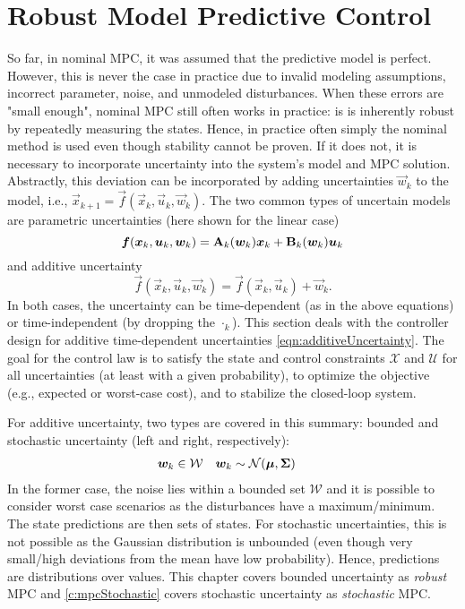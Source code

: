 \chapter{Robust Model Predictive Control}
	\label{c:mpcRobust}

	So far, in nominal MPC, it was assumed that the predictive model is perfect. However, this is never the case in practice due to invalid modeling assumptions, incorrect parameter, noise, and unmodeled disturbances. When these errors are "small enough", nominal MPC still often works in practice: is is inherently robust by repeatedly measuring the states. Hence, in practice often simply the nominal method is used even though stability cannot be proven. If it does not, it is necessary to incorporate uncertainty into the system's model and MPC solution. Abstractly, this deviation can be incorporated by adding uncertainties \(\vec{w}_k\) to the model, i.e., \( \vec{x}_{k + 1} = \vec{f}(\vec{x}_k, \vec{u}_k, \vec{w}_k) \). The two common types of uncertain models are parametric uncertainties (here shown for the linear case)
	\begin{equation}
		\bm{f}(\bm{x}_k, \bm{u}_k, \bm{w}_k) = \bm{\mathrm{A}}_k(\bm{w}_k) \bm{x}_k + \bm{\mathrm{B}}_k(\bm{w}_k) \bm{u}_k
	\end{equation}
	and additive uncertainty
	\begin{equation}
		\vec{f}(\vec{x}_k, \vec{u}_k, \vec{w}_k) = \vec{f}(\vec{x}_k, \vec{u}_k) + \vec{w}_k.  \label{eqn:additiveUncertainty}
	\end{equation}
	In both cases, the uncertainty can be time-dependent (as in the above equations) or time-independent (by dropping the \(\cdot_k\)). This section deals with the controller design for additive time-dependent uncertainties \eqref{eqn:additiveUncertainty}. The goal for the control law is to satisfy the state and control constraints \(\mathcal{X}\) and \(\mathcal{U}\) for all uncertainties (at least with a given probability), to optimize the objective (e.g., expected or worst-case cost), and to stabilize the closed-loop system.

	For additive uncertainty, two types are covered in this summary: bounded and stochastic uncertainty (left and right, respectively):
	\begin{align}
		\bm{w}_k & \in \mathcal{W}                           &
		\bm{w}_k & \sim \mathcal{N}(\bm{\mu}, \bm{\mathrm{\Sigma}})
	\end{align}
	In the former case, the noise lies within a bounded set \(\mathcal{W}\) and it is possible to consider worst case scenarios as the disturbances have a maximum/minimum. The state predictions are then sets of states. For stochastic uncertainties, this is not possible as the Gaussian distribution is unbounded (even though very small/high deviations from the mean have low probability). Hence, predictions are distributions over values. This chapter covers bounded uncertainty as \emph{robust} MPC and \autoref{c:mpcStochastic} covers stochastic uncertainty as \emph{stochastic} MPC.

